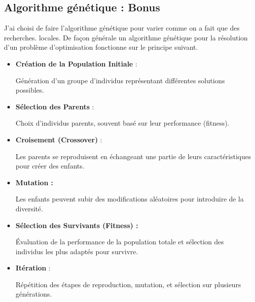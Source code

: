 \subsection{Algorithme génétique : Bonus}
J'ai choisi de faire l'algorithme génétique pour varier comme on a fait que des recherches. locales.
\newline
De façon générale un algorithme génétique pour la résolution d’un problème d’optimisation fonctionne sur le principe suivant.
\begin{itemize}
	\item \textbf{Création de la Population Initiale} :

Génération d'un groupe d'individus représentant différentes solutions possibles.

\item \textbf{Sélection des Parents }:

Choix d'individus parents, souvent basé sur leur performance (fitness).

\item \textbf{Croisement (Crossover) }:

Les parents se reproduisent en échangeant une partie de leurs caractéristiques pour créer des enfants.

\item \textbf{Mutation :}

Les enfants peuvent subir des modifications aléatoires pour introduire de la diversité.

\item \textbf{Sélection des Survivants (Fitness) :}

Évaluation de la performance de la population totale et sélection des individus les plus adaptés pour survivre.

\item \textbf{Itération }:

Répétition des étapes de reproduction, mutation, et sélection sur plusieurs générations.
\end{itemize}
